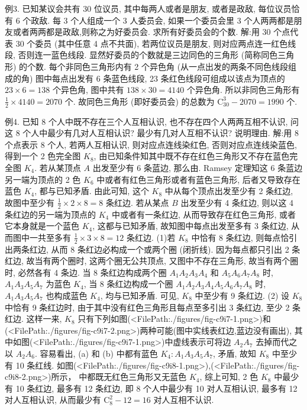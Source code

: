 例3. 已知某议会共有 30 位议员, 其中每两人或者是朋友, 或者是政敌, 每位议员恰有 6 个政敌.
每 3 个人组成一个 3 人委员会, 如果一个委员会里 3 个人两两都是朋友或者两两都是政敌,则称之为好委员会.
求所有好委员会的个数.
解:用 30 个点代表 30 个委员 (其中任意 4 点不共面), 若两位议员是朋友, 则对应两点连一红色线段, 否则连一蓝色线段.
显然好委员的个数就是三边同色的三角形 (简称同色三角形) 的个数.
每个非同色三角形内有 2 个异色角 (从一点出发的两条不同色线段组成的角) 图中每点出发有 6 条蓝色线段, 23 条红色线段可组成以该点为顶点的 $23 \times 6=138$ 个异色角, 图中共有 $138 \times 30=4140$ 个异色角.
所以非同色三角形有 $\frac{1}{2} \times 4140=2070$ 个.
故同色三角形 (即好委员会) 的总数为 $\mathrm{C}_{30}^3-2070=1990$ 个.



例4. 已知 8 个人中既不存在三个人互相认识, 也不存在四个人两两互相不认识, 问这 8 个人中最少有几对人互相认识? 最少有几对人互相不认识? 说明理由.
解:用 8 个点表示 8 个人, 若两人互相认识, 则对应点连线染红色, 否则对应点连线染蓝色, 得到一个 2 色完全图 $K_8$, 由已知条件知其中既不存在红色三角形又不存在蓝色完全图 $K_4$.
若从某顶点 $A$ 出发至少有 6 条蓝边, 那么由.
Ramsey 定理知这 6 条蓝边另一端为顶点的 2 色 $K_6$ 中或者有红色三角形或者有蓝色三角形, 后者又导致存在蓝色 $K_4$, 都与已知矛盾.
由此可知, 这个 $K_8$ 中从每个顶点出发至少有 2 条红边, 故图中至少有 $\frac{1}{2} \times 2 \times 8=8$ 条红边.
若从某点 $B$ 出发至少有 4 条红边, 则以这 4 条红边的另一端为顶点的 $K_4$ 中或者有一条红边, 从而导致存在红色三角形, 或者它本身就是一个蓝色 $K_4$, 这都与已知矛盾, 故知图中每点出发至多有 3 条红边, 从而图中一共至多有 $\frac{1}{2} \times 3 \times 8=12$ 条红边.
(1)若 $K_8$ 中恰有 8 条红边, 则每点恰引出两条红边, 从而 8 条红边必构成一个或两个圈 (闭折线). 因为每点都只引出 2 条红边, 故当有两个圈时, 这两个圈无公共顶点, 又图中不存在三角形, 故当有两个圈时, 必然各有 4 条边.
当 8 条红边构成两个圈 $A_1 A_2 A_3 A_4$ 和 $A_5 A_6 A_7 A_8$ 时, $A_1 A_3 A_5 A_7$ 为蓝色 $K_4$, 当 8 条红边构成一个圈 $A_1 A_2 A_3 A_4 A_5 A_6 A_7 A_8$ 时, $A_1 A_3 A_5 A_7$ 也构成蓝色 $K_4$, 均与已知矛盾.
可见, $K_8$ 中至少有 9 条红边.
(2) 设 $K_8$ 中恰有 9 条红边时, 由于其中没有红色三角形且每点至多引出 3 条红边, 至少 2 条红边.
这样一来, $K_8$ 只有下列如图(<FilePath:./figures/fig-c9i7-1.png>)和(<FilePath:./figures/fig-c9i7-2.png>)两种可能(图中实线表红边,蓝边没有画出), 其中如图(<FilePath:./figures/fig-c9i7-1.png>)中虚线表示可将边 $A_2 A_7$ 去掉而代之以 $A_2 A_6$. 容易看出, (a) 和 (b) 中都有蓝色 $K_4: A_1 A_3 A_5 A_7$, 矛盾, 故知 $K_8$ 中至少有 10 条红线.
如图(<FilePath:./figures/fig-c9i8-1.png>),(<FilePath:./figures/fig-c9i8-2.png>)所示， 中都既无红色三角形又无蓝色 $K_4$, 综上可知, 2 色 $K_8$ 中最少有 10 条红边, 最多有 12 条红边, 即 8 个人中最少有 10 对人互相认识, 最多有 12 对人互相认识, 从而最少有 $\mathrm{C}_8^2-12=16$ 对人互相不认识.



